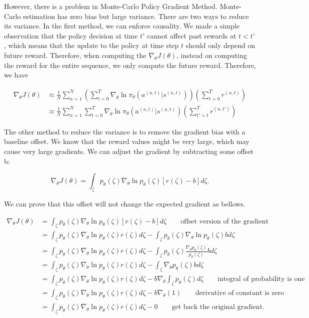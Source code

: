 \documentclass[11pt]{article}
\begin{document}
However, there is a problem in Monte-Carlo Policy Gradient Method. Monte-Carlo estimation has zero bias but large variance. There are two ways to reduce its variance. In the first method, we can enforce causality. We made a simple observation that the policy decision at time $t'$ cannot affect past rewards at $t<t’$, which means that the update to the policy at time step $t$ should only depend on future reward. Therefore, when computing the $\nabla_{\theta} J(\theta)$, instead on computing the reward for the entire sequence, we only compute the future reward. Therefore, we have 

\begin{equation*}
\begin{split}
\nabla_{\theta} J(\theta) &\approx \frac{1}{N} \sum_{n=1}^{N}(\sum_{t=0}^T \nabla_\theta \ln \pi_\theta(a^{(n,t)}|s^{(n,t)}))(\sum_{t=0}^T r^{(n,t)})\\
&\approx \frac{1}{N}\sum_{n=1}^{N}\sum_{t=0}^T \nabla_\theta \ln \pi_\theta(a^{(n,t)}|s^{(n,t)}) (\sum_{t'=t}^{T}r^{(n,t')})
\end{split}
\end{equation*}


The other method to reduce the variance is to remove the gradient bias with a baseline offset. We know that the reward values might be very large, which may cause very large gradients. We can adjust the gradient by subtracting some offset b:

$$\nabla_{\theta} J(\theta) = \int_\zeta p_\theta(\zeta)\nabla_\theta \ln p_\theta(\zeta)[r(\zeta)-b]d\zeta.$$

We can prove that this offset will not change the expected gradient as bellows.

\begin{equation*}
\begin{split}
\nabla_{\theta} J(\theta) &=  \int_\zeta p_\theta(\zeta)\nabla_\theta \ln p_\theta(\zeta)[r(\zeta)-b]d\zeta \qquad \text{offset version of the gradient}\\
& = \int_\zeta p_\theta(\zeta)\nabla_\theta \ln p_\theta(\zeta)r(\zeta)d\zeta - \int_\zeta p_\theta(\zeta)\nabla_\theta \ln p_\theta(\zeta)b d\zeta\\
& = \int_\zeta p_\theta(\zeta)\nabla_\theta \ln p_\theta(\zeta)r(\zeta)d\zeta - \int_\zeta p_\theta(\zeta) \frac{\nabla_\theta p_\theta(\zeta)}{p_\theta(\zeta)} b d\zeta \\
& = \int_\zeta p_\theta(\zeta)\nabla_\theta \ln p_\theta(\zeta)r(\zeta)d\zeta - \int_\zeta \nabla_\theta p_\theta(\zeta)b d\zeta \\
& = \int_\zeta p_\theta(\zeta)\nabla_\theta \ln p_\theta(\zeta)r(\zeta)d\zeta - b \nabla_\theta \int_\zeta  p_\theta(\zeta) d\zeta \qquad \text{integral of probability is one}\\
& = \int_\zeta p_\theta(\zeta)\nabla_\theta \ln p_\theta(\zeta)r(\zeta)d\zeta - b \nabla_\theta (1) \qquad \text{derivative of constant is zero}\\
& = \int_\zeta p_\theta(\zeta)\nabla_\theta \ln p_\theta(\zeta)r(\zeta)d\zeta - 0 \qquad \text{get back the original gradient.} 
\end{split}
\end{equation*}
\end{document}
